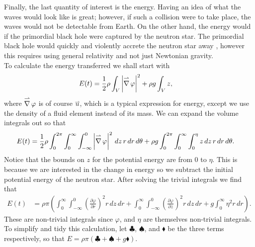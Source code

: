 Finally, the last quantity of interest is the energy. Having an idea of what the waves would look like is great; however, if such a collision were to take place, the waves would not be detectable from Earth. On the other hand, the energy would if the primordial black hole were captured by the neutron star. The primordial black hole would quickly and violently accrete the neutron star away \cite{merger, mergerjets}, however this requires using general relativity and not just Newtonian gravity. \\

To calculate the energy transferred we shall start with
\begin{align*}
E(t) &= \frac{1}{2} \rho \int_V \left| \operatorname{\overset{\rightharpoonup}\nabla} \varphi \right|^2 + \rho g \int_V z,
\end{align*}
where $\operatorname{\overset{\rightharpoonup}\nabla} \varphi$ is of course $\overset{\rightharpoonup}u$, which is a typical expression for energy, except we use the density of a fluid element instead of its mass. We can expand the volume integrals out so that 
\begin{align*}
E(t) &= \frac{1}{2} \rho \int_0^{2\pi} \int_0^\infty \int_{-\infty}^0 \left| \operatorname{\overset{\rightharpoonup}\nabla} \varphi \right|^2 \, dz \, r \, dr \, d\theta + \rho g \int_0^{2\pi} \int_0^\infty \int_0^\eta z \, dz \, r \, dr \, d\theta.
\end{align*}
Notice that the bounds on $z$ for the potential energy are from $0$ to $\eta$. This is because we are interested in the change in energy so we subtract the initial potential energy of the neutron star. After solving the trivial integrals we find that
\begin{align*}
E(t) &= \rho \pi \left( \int_0^\infty \int_{-\infty}^0 \left( \frac{\partial \varphi}{\partial r} \right)^2 r \, dz \, dr + \int_0^\infty \int_{-\infty}^0 \left( \frac{\partial \varphi}{\partial z} \right)^2 r \, dz \, dr + g \int_0^\infty \eta^2 r \, dr \right).
\end{align*}
These are non-trivial integrals since $\varphi$, and $\eta$ are themselves non-trivial integrals. To simplify and tidy this calculation, let $\clubsuit$, $\spadesuit$, and $\blacklozenge$ be the three terms respectively, so that $E = \rho \pi (\clubsuit + \spadesuit + g \blacklozenge)$. \\

